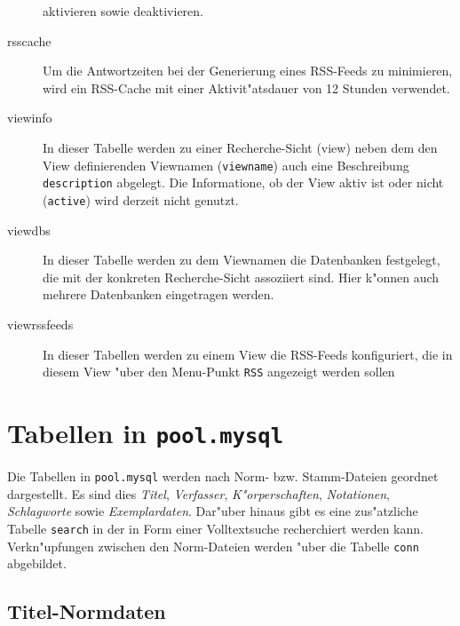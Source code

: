 \documentclass[11pt, twoside, a4paper, BCOR8mm, DIV12, bibtotoc,idxtotoc]{scrbook}
\begin{document}
\begin{description}
  aktivieren sowie deaktivieren.
\item[rsscache] Um die Antwortzeiten bei der Generierung eines
  RSS-Feeds zu minimieren, wird ein RSS-Cache mit einer
  Aktivit"atsdauer von 12 Stunden verwendet.
\item[viewinfo] In dieser Tabelle werden zu einer Recherche-Sicht
  (view) neben dem den View de\-fi\-nier\-enden Viewnamen
  (\texttt{viewname}) auch eine Beschreibung \texttt{description}
  abgelegt. Die Informatione, ob der View aktiv ist oder nicht
  (\texttt{active}) wird derzeit nicht genutzt.
\item[viewdbs] In dieser Tabelle werden zu dem Viewnamen die Daten\-banken
  festgelegt, die mit der konkreten Recherche-Sicht assoziiert
  sind. Hier k"onnen auch mehrere Daten\-banken ein\-ge\-tra\-gen werden.
\item[viewrssfeeds] In dieser Tabellen werden zu einem View die
  RSS-Feeds konfiguriert, die in diesem View "uber den Menu-Punkt
  \texttt{RSS} angezeigt werden sollen

\end{description}



\chapter{Tabellen in \texttt{pool.mysql}}

Die Tabellen in \texttt{pool.mysql} werden nach Norm- bzw.
Stamm-Dateien geordnet dargestellt. Es sind dies \emph{Titel},
\emph{Verfasser}, \emph{K"orperschaften}, \emph{Notationen},
\emph{Schlagworte} sowie \emph{Exemplardaten}. Dar"uber hinaus gibt es eine zus"atzliche
Tabelle \texttt{search} in der in Form einer Volltextsuche
recherchiert werden kann. Verkn"upfungen zwischen den Norm-Dateien
werden "uber die Tabelle \texttt{conn} abgebildet.

\section{Titel-Normdaten}
\end{document}
